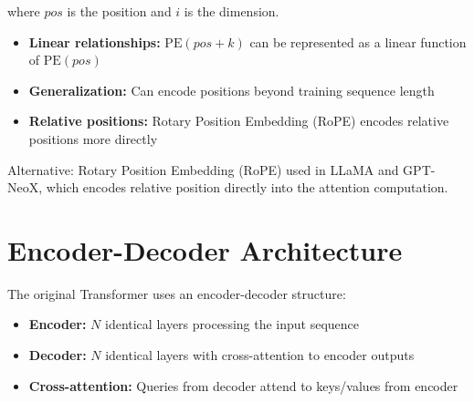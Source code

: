 where $pos$ is the position and $i$ is the dimension.

\begin{properties}
\begin{itemize}
    \item \textbf{Linear relationships:} $\text{PE}(pos+k)$ can be represented as a linear function of $\text{PE}(pos)$
    \item \textbf{Generalization:} Can encode positions beyond training sequence length
    \item \textbf{Relative positions:} Rotary Position Embedding (RoPE) encodes relative positions more directly
\end{itemize}
\end{properties}

Alternative: Rotary Position Embedding (RoPE) used in LLaMA and GPT-NeoX, which encodes relative position directly into the attention computation.

\section{Encoder-Decoder Architecture}

The original Transformer uses an encoder-decoder structure:

\begin{itemize}
    \item \textbf{Encoder:} $N$ identical layers processing the input sequence
    \item \textbf{Decoder:} $N$ identical layers with cross-attention to encoder outputs
    \item \textbf{Cross-attention:} Queries from decoder attend to keys/values from encoder
\end{itemize}

